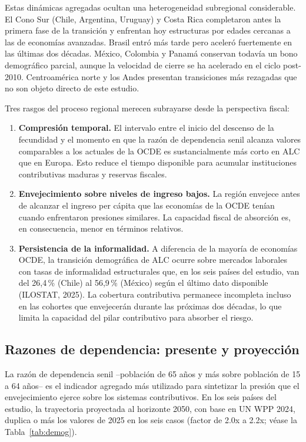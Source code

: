 \documentclass[12pt, letterpaper]{article}
\begin{document}
Estas dinámicas agregadas ocultan una heterogeneidad subregional considerable. El
Cono Sur (Chile, Argentina, Uruguay) y Costa Rica completaron antes la primera
fase de la transición y enfrentan hoy estructuras por edades cercanas a las de
economías avanzadas. Brasil entró más tarde pero aceleró fuertemente en las últimas
dos décadas. México, Colombia y Panamá conservan todavía un bono demográfico
parcial, aunque la velocidad de cierre se ha acelerado en el ciclo
post-2010. Centroamérica norte y los Andes presentan transiciones más rezagadas que
no son objeto directo de este estudio.

Tres rasgos del proceso regional merecen subrayarse desde la perspectiva fiscal:

\begin{enumerate}
  \item \textbf{Compresión temporal.} El intervalo entre el inicio del descenso de la
        fecundidad y el momento en que la razón de dependencia senil alcanza
        valores comparables a los actuales de la OCDE es sustancialmente más corto
        en ALC que en Europa. Esto reduce el tiempo disponible para acumular
        instituciones contributivas maduras y reservas fiscales.
  \item \textbf{Envejecimiento sobre niveles de ingreso bajos.} La región envejece
        antes de alcanzar el ingreso per cápita que las economías de la OCDE tenían
        cuando enfrentaron presiones similares. La capacidad fiscal de absorción es,
        en consecuencia, menor en términos relativos.
  \item \textbf{Persistencia de la informalidad.} A diferencia de la mayoría de
        economías OCDE, la transición demográfica de ALC ocurre sobre mercados
        laborales con tasas de informalidad estructurales que, en los seis países
        del estudio, van del 26{,}4\,\% (Chile) al 56{,}9\,\% (México) según el
        último dato disponible (ILOSTAT, 2025). La cobertura contributiva permanece
        incompleta incluso en las cohortes que envejecerán durante las próximas dos
        décadas, lo que limita la capacidad del pilar contributivo para absorber el
        riesgo.
\end{enumerate}

\subsection{Razones de dependencia: presente y proyección}

La razón de dependencia senil --población de 65 años y más sobre población de 15 a
64 años-- es el indicador agregado más utilizado para sintetizar la presión que el
envejecimiento ejerce sobre los sistemas contributivos. En los seis países del
estudio, la trayectoria proyectada al horizonte 2050, con base en UN WPP 2024,
duplica o más los valores de 2025 en los seis casos (factor de 2.0x a 2.2x; véase la
Tabla~\ref{tab:demog}).
\end{document}

